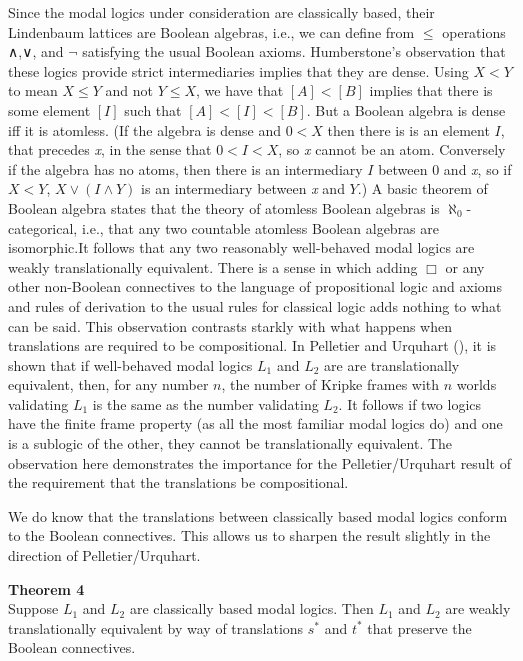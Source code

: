 \documentclass[
  10pt,
  letterpaper,
  DIV=11,
  numbers=noendperiod,
  twoside]{scrartcl}
\begin{document}
Since the modal logics under consideration are classically based, their
Lindenbaum lattices are Boolean algebras, i.e., we can define from
\(\le\) operations ∧,∨, and \(\neg\) satisfying the usual Boolean
axioms. Humberstone's observation that these logics provide strict
intermediaries implies that they are dense. Using \(X{<}Y\) to mean
\(X\le Y\) and not \(Y\le X\), we have that \([A]{<}[B]\) implies that
there is some element \([I]\) such that \([A]{<}[I]{<}[B]\). But a
Boolean algebra is dense iff it is atomless. (If the algebra is dense
and \(0{<}X\) then there is is an element \(I\), that precedes \emph{x},
in the sense that \(0{<}I{<}X\), so \emph{x} cannot be an atom.
Conversely if the algebra has no atoms, then there is an intermediary
\(I\) between \(0\) and \emph{x}, so if \(X{<}Y\), \(X\vee (I\wedge Y)\)
is an intermediary between \emph{x} and \(Y\).) A basic theorem of
Boolean algebra states that the theory of atomless Boolean algebras is
\(\aleph_0\)-categorical, i.e., that any two countable atomless Boolean
algebras are isomorphic.It follows that any two reasonably well-behaved
modal logics are weakly translationally equivalent. There is a sense in
which adding \(\Box\) or any other non-Boolean connectives to the
language of propositional logic and axioms and rules of derivation to
the usual rules for classical logic adds nothing to what can be said.
This observation contrasts starkly with what happens when translations
are required to be compositional. In Pelletier and Urquhart
(), it is shown that if
well-behaved modal logics \(L_1\) and \(L_2\) are are translationally
equivalent, then, for any number \(n\), the number of Kripke frames with
\(n\) worlds validating \(L_1\) is the same as the number validating
\(L_2\). It follows if two logics have the finite frame property (as all
the most familiar modal logics do) and one is a sublogic of the other,
they cannot be translationally equivalent. The observation here
demonstrates the importance for the Pelletier/Urquhart result of the
requirement that the translations be compositional.

We do know that the translations between classically based modal logics
conform to the Boolean connectives. This allows us to sharpen the result
slightly in the direction of Pelletier/Urquhart.

\textbf{Theorem 4}\\
Suppose \(L_1\) and \(L_2\) are classically based modal logics. Then
\(L_1\) and \(L_2\) are weakly translationally equivalent by way of
translations \(s^*\) and \(t^*\) that preserve the Boolean connectives.
\end{document}
